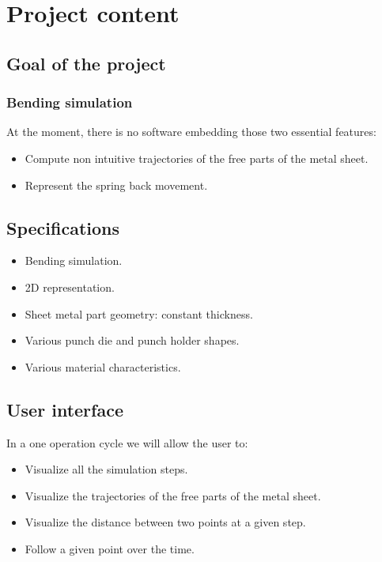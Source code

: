 \documentclass{beamer}
\begin{document}
\section{Project content}
\subsection{Goal of the project}
\begin{frame}
\frametitle{Bending simulation}
    At the moment, there is no software embedding those two essential features:
    \begin{itemize}
        \item Compute non intuitive trajectories of the free parts of the metal sheet.
        \item Represent the spring back movement.
    \end{itemize}
\end{frame}
\subsection{Specifications}
\begin{frame}
    \begin{itemize}
        \item Bending simulation.
        \item 2D representation.
        \item Sheet metal part geometry: constant thickness.
        \item Various punch die and punch holder shapes.
        \item Various material characteristics.
    \end{itemize}
\end{frame}
\subsection{User interface}
\begin{frame}
    In a one operation cycle we will allow the user to:
    \begin{itemize}
        \item Visualize all the simulation steps.
        \item Visualize the trajectories of the free parts of the metal sheet.
        \item Visualize the distance between two points at a given step.
        \item Follow a given point over the time.
    \end{itemize}
\end{frame}
\end{document}
